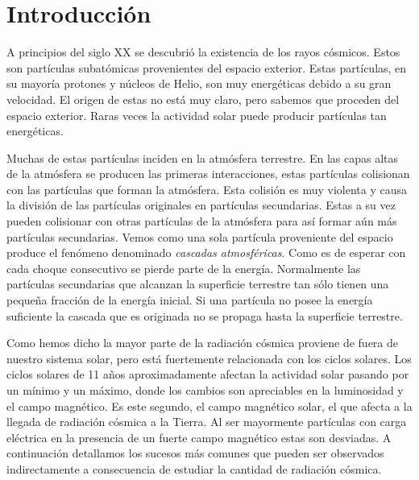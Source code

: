 \chapter{Introducción}
\label{cap1}

A principios del siglo XX se descubrió la existencia de los rayos cósmicos. Estos son partículas subatómicas provenientes del espacio exterior. Estas
partículas, en su mayoría protones y núcleos de Helio, son muy energéticas debido a su gran velocidad. El origen de estas no está muy claro, pero
sabemos que proceden del espacio exterior. Raras veces la actividad solar puede producir partículas tan energéticas. 
\par
Muchas de estas partículas inciden en la atmósfera terrestre. En las capas altas de la atmósfera se producen las primeras interacciones, estas
partículas colisionan con las partículas que forman la atmósfera. Esta colisión es muy violenta y causa la división de las partículas originales en
partículas secundarias. Estas a su vez pueden colisionar con otras partículas de la atmósfera para así formar aún más partículas secundarias. Vemos
como una sola partícula proveniente del espacio produce el fenómeno denominado \emph{cascadas atmosféricas}. Como es de esperar con cada choque
consecutivo se pierde parte de la energía. Normalmente las partículas secundarias que alcanzan la superficie terrestre tan sólo tienen una pequeña
fracción de la energía inicial. Si una partícula no posee la energía suficiente la cascada que es originada no se propaga hasta la superficie
terrestre.
\par
Como hemos dicho la mayor parte de la radiación cósmica proviene de fuera de nuestro sistema solar, pero está fuertemente relacionada con los ciclos
solares. Los ciclos solares de 11 años aproximadamente afectan la actividad solar pasando por un mínimo y un máximo, donde los cambios son apreciables
en la luminosidad y el campo magnético. Es este segundo, el campo magnético solar, el que afecta a la llegada de radiación cósmica a la Tierra. Al ser
mayormente partículas con carga eléctrica en la presencia de un fuerte campo magnético estas son desviadas. A continuación detallamos los sucesos más
comunes que pueden ser observados indirectamente a consecuencia de estudiar la cantidad de radiación cósmica.

